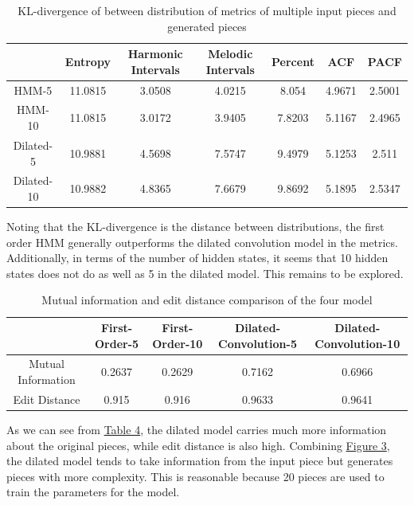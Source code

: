 \documentclass[10pt, oneside]{article}
\begin{document}
\begin{table}[H]
\centering
\begin{tabular}{|c|c|c|c|c|c|c|}
\hline
           & Entropy & Harmonic Intervals & Melodic Intervals & Percent & ACF    & PACF   \\ \hline
HMM-5      & 11.0815 & 3.0508  & 4.0215  & 8.054   & 4.9671 & 2.5001 \\ \hline
HMM-10     & 11.0815 & 3.0172  & 3.9405  & 7.8203  & 5.1167 & 2.4965 \\ \hline
Dilated-5  & 10.9881 & 4.5698  & 7.5747  & 9.4979  & 5.1253 & 2.511  \\ \hline
Dilated-10 & 10.9882 & 4.8365  & 7.6679  & 9.8692  & 5.1895 & 2.5347 \\ \hline
\end{tabular}
\caption{KL-divergence of between distribution of metrics of multiple input pieces and generated pieces}
\label{table: multiple metrics}
\end{table}
Noting that the KL-divergence is the distance between distributions, the first order HMM generally outperforms the dilated convolution model in the metrics. Additionally, in terms of the number of hidden states, it seems that 10 hidden states does not do as well as 5 in the dilated model. This remains to be explored. 

\begin{table}[H]
\centering
\begin{tabular}{|c|c|c|c|c|}
\hline
                   & First-Order-5 & First-Order-10 & Dilated-Convolution-5 & Dilated-Convolution-10 \\ \hline
Mutual Information & 0.2637        & 0.2629         & 0.7162                & 0.6966                 \\ \hline
Edit Distance      & 0.915         & 0.916          & 0.9633                & 0.9641                 \\ \hline
\end{tabular}
\caption{Mutual information and edit distance comparison of the four model}
\label{table:mued}
\end{table}
As we can see from \hyperref[table:mued]{Table 4}, the dilated model carries much more information about the original pieces, while edit distance is also high. Combining \hyperref[fig:mued]{Figure 3}, the dilated model tends to take information from the input piece but generates pieces with more complexity. This is reasonable because 20 pieces are used to train the parameters for the model. %
\end{document}
